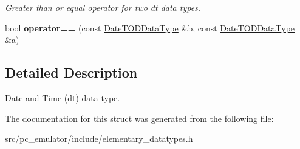 \begin{DoxyCompactItemize}
\begin{DoxyCompactList}\small\item\em Greater than or equal operator for two dt data types. \end{DoxyCompactList}\item 
bool {\bfseries operator==} (const \hyperlink{structpc__emulator_1_1DateTODDataType}{Date\+T\+O\+D\+Data\+Type} \&b, const \hyperlink{structpc__emulator_1_1DateTODDataType}{Date\+T\+O\+D\+Data\+Type} \&a)\hypertarget{structpc__emulator_1_1DateTODDataType_a61e8dac6a0bb3bde076ce024ae4de7f1}{}\label{structpc__emulator_1_1DateTODDataType_a61e8dac6a0bb3bde076ce024ae4de7f1}

\end{DoxyCompactItemize}


\subsection{Detailed Description}
Date and Time (dt) data type. 

The documentation for this struct was generated from the following file\+:\begin{DoxyCompactItemize}
\item 
src/pc\+\_\+emulator/include/elementary\+\_\+datatypes.\+h\end{DoxyCompactItemize}
